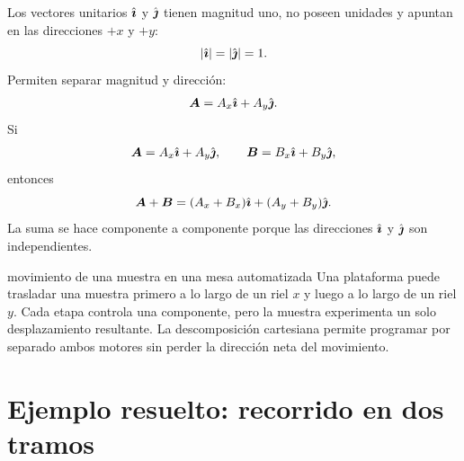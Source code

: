 \documentclass[11pt]{article}
\begin{document}
Los vectores unitarios \(\hat{\boldsymbol{\imath}}\) y \(\hat{\boldsymbol{\jmath}}\) tienen
magnitud uno, no poseen unidades y apuntan en las direcciones \(+x\) y \(+y\):
\[
  |\hat{\boldsymbol{\imath}}|=|\hat{\boldsymbol{\jmath}}|=1.
\]
Permiten separar magnitud y dirección:
\[
  \boldsymbol{A}=A_x\hat{\boldsymbol{\imath}}+A_y\hat{\boldsymbol{\jmath}}.
\]
Si
\[
  \boldsymbol{A}=A_x\hat{\boldsymbol{\imath}}+A_y\hat{\boldsymbol{\jmath}},
  \qquad
  \boldsymbol{B}=B_x\hat{\boldsymbol{\imath}}+B_y\hat{\boldsymbol{\jmath}},
\]
entonces
\[
  \boldsymbol{A}+\boldsymbol{B}
  =
  (A_x+B_x)\hat{\boldsymbol{\imath}}
  +(A_y+B_y)\hat{\boldsymbol{\jmath}}.
\]
La suma se hace componente a componente porque las direcciones
\(\hat{\boldsymbol{\imath}}\) y \(\hat{\boldsymbol{\jmath}}\) son independientes.

\begin{center}
\end{center}

\begin{ejemplocualitativo}{movimiento de una muestra en una mesa automatizada}
Una plataforma puede trasladar una muestra primero a lo largo de un riel \(x\)
y luego a lo largo de un riel \(y\). Cada etapa controla una componente, pero
la muestra experimenta un solo desplazamiento resultante. La descomposición
cartesiana permite programar por separado ambos motores sin perder la
dirección neta del movimiento.
\end{ejemplocualitativo}

\section{Ejemplo resuelto: recorrido en dos tramos}
\end{document}
